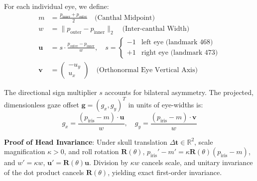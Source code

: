 \documentclass[10pt,twocolumn]{article}
\begin{document}
For each individual eye, we define:
\begin{align}
    m &= \frac{p_{\text{inner}} + p_{\text{outer}}}{2} \quad \text{(Canthal Midpoint)} \\
    w &= \|p_{\text{outer}} - p_{\text{inner}}\|_2 \quad \text{(Inter-canthal Width)} \\
    \mathbf{u} &= s \cdot \frac{p_{\text{outer}} - p_{\text{inner}}}{w}, \quad s = {\begin{cases} -1 & \text{left eye (landmark 468)} \\ +1 & \text{right eye (landmark 473)} \end{cases}} \\
    \mathbf{v} &= \begin{pmatrix} -u_y \\ u_x \end{pmatrix} \quad \text{(Orthonormal Eye Vertical Axis)}
\end{align}

The directional sign multiplier $s$ accounts for bilateral asymmetry. The projected, dimensionless gaze offset $\mathbf{g} = (g_x, g_y)^T$ in units of eye-widths is:
\begin{equation}
    g_x = \frac{(p_{\text{iris}} - m) \cdot \mathbf{u}}{w}, \quad g_y = \frac{(p_{\text{iris}} - m) \cdot \mathbf{v}}{w}
\end{equation}

\textbf{Proof of Head Invariance}: Under skull translation $\Delta \mathbf{t} \in \mathbb{R}^2$, scale magnification $\kappa > 0$, and roll rotation $\mathbf{R}(\theta)$, $p_{\text{iris}}' - m' = \kappa \mathbf{R}(\theta)(p_{\text{iris}} - m)$, and $w' = \kappa w$, $\mathbf{u}' = \mathbf{R}(\theta)\mathbf{u}$. Division by $\kappa w$ cancels scale, and unitary invariance of the dot product cancels $\mathbf{R}(\theta)$, yielding exact first-order invariance.
\end{document}
